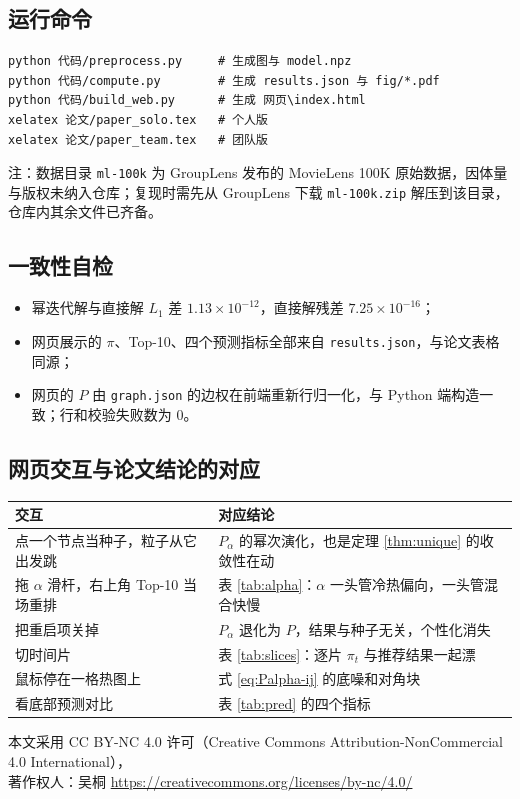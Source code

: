 \documentclass[12pt,a4paper]{ctexart}
\begin{document}
\subsection{运行命令}

\begin{verbatim}
python 代码/preprocess.py     # 生成图与 model.npz
python 代码/compute.py        # 生成 results.json 与 fig/*.pdf
python 代码/build_web.py      # 生成 网页\index.html
xelatex 论文/paper_solo.tex   # 个人版
xelatex 论文/paper_team.tex   # 团队版
\end{verbatim}

\noindent 注：数据目录 \texttt{ml-100k} 为 GroupLens 发布的 MovieLens 100K 原始数据，因体量与版权未纳入仓库；复现时需先从 GroupLens 下载 \texttt{ml-100k.zip} 解压到该目录，仓库内其余文件已齐备。

\subsection{一致性自检}

\begin{itemize}[leftmargin=1.6em]
\item 幂迭代解与直接解 $L_1$ 差 $1.13\times10^{-12}$，直接解残差 $7.25\times10^{-16}$；
\item 网页展示的 $\pi$、Top-10、四个预测指标全部来自 \texttt{results.json}，与论文表格同源；
\item 网页的 $P$ 由 \texttt{graph.json} 的边权在前端重新行归一化，与 Python 端构造一致；行和校验失败数为 $0$。
\end{itemize}

\subsection{网页交互与论文结论的对应}

\begin{table}[H]
\centering
\small
\begin{tabular}{p{}p{}}
\toprule
交互 & 对应结论 \\
\midrule
点一个节点当种子，粒子从它出发跳 & $P_{\alpha}$ 的幂次演化，也是定理 \ref{thm:unique} 的收敛性在动 \\
拖 $\alpha$ 滑杆，右上角 Top-10 当场重排 & 表 \ref{tab:alpha}：$\alpha$ 一头管冷热偏向，一头管混合快慢 \\
把重启项关掉 & $P_{\alpha}$ 退化为 $P$，结果与种子无关，个性化消失 \\
切时间片 & 表 \ref{tab:slices}：逐片 $\pi_t$ 与推荐结果一起漂 \\
鼠标停在一格热图上 & 式 \eqref{eq:Palpha-ij} 的底噪和对角块 \\
看底部预测对比 & 表 \ref{tab:pred} 的四个指标 \\
\bottomrule
\end{tabular}
\end{table}

\vspace{1.2em}
\begin{center}
{\footnotesize 本文采用 CC BY-NC 4.0 许可（Creative Commons Attribution-NonCommercial 4.0 International），\\
著作权人：吴桐 \quad \url{https://creativecommons.org/licenses/by-nc/4.0/}}
\end{center}
\end{document}
